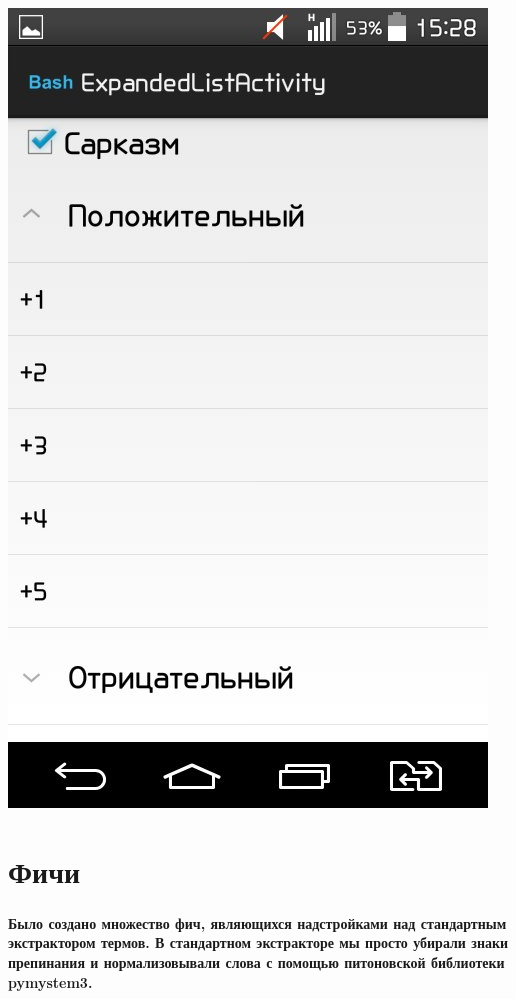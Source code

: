 \documentclass[t]{beamer}
\begin{document}
\begin{frame}
{			\includegraphics[scale = 0.17]{images/Bash3.jpg}}
	\end{frame}
	
	
	\section{Фичи}
	\begin{frame}
		\frametitle{\insertsection}
		\textbf{Было создано множество фич, являющихся надстройками над стандартным экстрактором термов. В стандартном экстракторе мы просто убирали знаки препинания и нормализовывали слова с помощью питоновской библиотеки pymystem3.}
	\end{frame}
	
\end{document}
